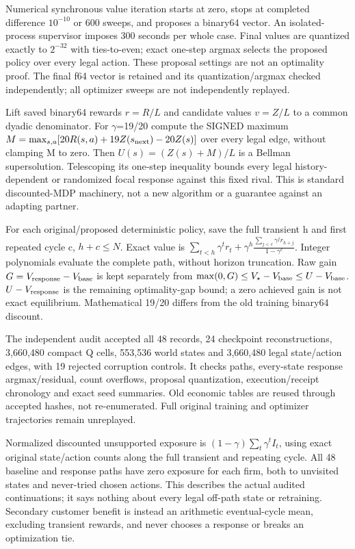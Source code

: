 \documentclass[a4paper,10pt]{article}
\begin{document}
Numerical synchronous value iteration starts at zero, stops at completed difference $10^{-10}$ or 600 sweeps, and proposes a binary64 vector. An isolated-process supervisor imposes 300 seconds per whole case. Final values are quantized exactly to $2^{-32}$ with ties-to-even; exact one-step argmax selects the proposed policy over every legal action. These proposal settings are not an optimality proof. The final f64 vector is retained and its quantization/argmax checked independently; all optimizer sweeps are not independently replayed.
\par

Lift saved binary64 rewards $r=R/L$ and candidate values $v=Z/L$ to a common dyadic denominator. For $\gamma$=19/20 compute the SIGNED maximum $M=\max_{s,a}[20R(s,a)+19Z(s_{\rm next})-20Z(s)]$ over every legal edge, without clamping M to zero. Then $U(s)=(Z(s)+M)/L$ is a Bellman supersolution. Telescoping its one-step inequality bounds every legal history-dependent or randomized focal response against this fixed rival. This is standard discounted-MDP machinery, not a new algorithm or a guarantee against an adapting partner.
\par

For each original/proposed deterministic policy, save the full transient h and first repeated cycle c, $h+c\leq N$. Exact value is $\sum_{t<h}\gamma^t r_t+\gamma^h\frac{\sum_{j<c}\gamma^j r_{h+j}}{1-\gamma^c}$. Integer polynomials evaluate the complete path, without horizon truncation. Raw gain $G=V_{\rm response}-V_{\rm base}$ is kept separately from $\max(0,G)\leq V_\star-V_{\rm base}\leq U-V_{\rm base}$. $U-V_{\rm response}$ is the remaining optimality-gap bound; a zero achieved gain is not exact equilibrium. Mathematical 19/20 differs from the old training binary64 discount.
\par

The independent audit accepted all 48 records, 24 checkpoint reconstructions, 3,660,480 compact Q cells, 553,536 world states and 3,660,480 legal state/action edges, with 19 rejected corruption controls. It checks paths, every-state response argmax/residual, count overflows, proposal quantization, execution/receipt chronology and exact seed summaries. Old economic tables are reused through accepted hashes, not re-enumerated. Full original training and optimizer trajectories remain unreplayed.
\par

Normalized discounted unsupported exposure is $(1-\gamma)\sum_t\gamma^t I_t$, using exact original state/action counts along the full transient and repeating cycle. All 48 baseline and response paths have zero exposure for each firm, both to unvisited states and never-tried chosen actions. This describes the actual audited continuations; it says nothing about every legal off-path state or retraining. Secondary customer benefit is instead an arithmetic eventual-cycle mean, excluding transient rewards, and never chooses a response or breaks an optimization tie.
\par
\end{document}
